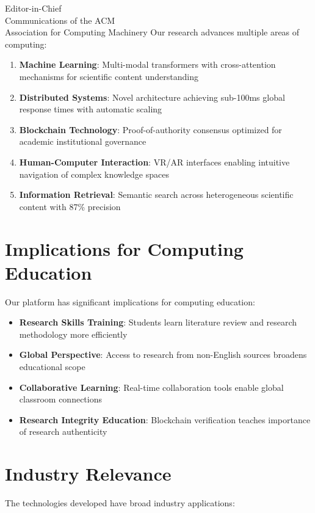 \documentclass[11pt]{letter}
\begin{document}
\begin{letter}{Editor-in-Chief\\
Communications of the ACM\\
Association for Computing Machinery}
Our research advances multiple areas of computing:

\begin{enumerate}
    \item \textbf{Machine Learning}: Multi-modal transformers with cross-attention mechanisms for scientific content understanding
    
    \item \textbf{Distributed Systems}: Novel architecture achieving sub-100ms global response times with automatic scaling
    
    \item \textbf{Blockchain Technology}: Proof-of-authority consensus optimized for academic institutional governance
    
    \item \textbf{Human-Computer Interaction}: VR/AR interfaces enabling intuitive navigation of complex knowledge spaces
    
    \item \textbf{Information Retrieval}: Semantic search across heterogeneous scientific content with 87\% precision
\end{enumerate}

\section*{Implications for Computing Education}

Our platform has significant implications for computing education:

\begin{itemize}
    \item \textbf{Research Skills Training}: Students learn literature review and research methodology more efficiently
    \item \textbf{Global Perspective}: Access to research from non-English sources broadens educational scope
    \item \textbf{Collaborative Learning}: Real-time collaboration tools enable global classroom connections
    \item \textbf{Research Integrity Education}: Blockchain verification teaches importance of research authenticity
\end{itemize}

\section*{Industry Relevance}

The technologies developed have broad industry applications:


\end{letter}
\end{document}
